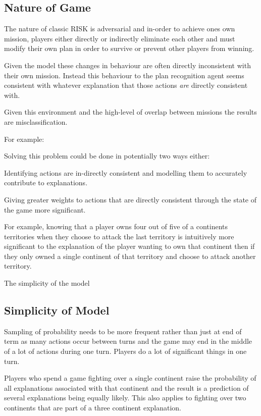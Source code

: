 \documentclass[parskip]{cs4rep}
\begin{document}
\subsection{Nature of Game}

The nature of classic RISK is adversarial and in-order to achieve ones own mission, players either directly or indirectly eliminate each other and must modify their own plan in order to survive or prevent other players from winning. 

Given the model these changes in behaviour are often directly inconsistent with their own mission. Instead this behaviour to the plan recognition agent seems consistent with whatever explanation that those actions \textit{are} directly consistent with.

Given this environment and the high-level of overlap between missions the results are misclassification.

For example:

Solving this problem could be done in potentially two ways either:

Identifying actions are in-directly consistent and modelling them to accurately contribute to explanations.
 
Giving greater weights to actions that are directly consistent through the state of the game  more significant.

For example, knowing that a player owns four out of five of a continents territories when they choose to attack the last territory is intuitively more significant to the explanation of the player wanting to own that continent then if they only owned a single continent of that territory and choose to attack another territory.

The simplicity of the model 

\subsection{Simplicity of Model}

Sampling of probability needs to be more frequent rather than just at end of term as many actions occur between turns and the game may end in the middle of a lot of actions during one turn. Players do a lot of significant things in one turn.

Players who spend a game fighting over a single continent raise the probability of all explanations associated with that continent and the result is a prediction of several explanations being equally likely. This also applies to fighting over two continents that are part of a three continent explanation.
\end{document}
